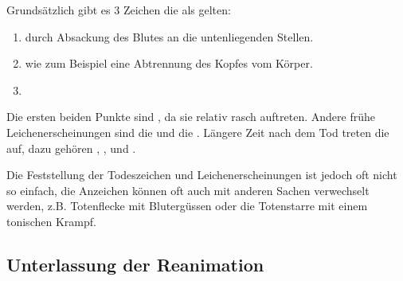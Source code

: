 {
Grundsätzlich gibt es 3 Zeichen die als  gelten\cite{ForMed2}:

\begin{enumerate}
    \item {} durch
    Absackung des Blutes an die untenliegenden Stellen.
    \item {}
    wie zum Beispiel eine Abtrennung des Kopfes vom Körper.
    \item {}
\end{enumerate}

Die ersten beiden Punkte sind , da sie relativ
rasch auftreten. Andere frühe Leichenerscheinungen sind die  und die . Längere Zeit nach dem Tod treten die  auf, dazu gehören ,
,  und .

Die Feststellung der Todeszeichen und Leichenerscheinungen
ist jedoch oft nicht so einfach, die Anzeichen können oft
auch mit anderen Sachen verwechselt werden, z.B.
Totenflecke mit Blutergüssen oder die Totenstarre mit einem
tonischen Krampf.
}{}{}{}{}






\subsection{Unterlassung der Reanimation}
\label{topic:reanimation-unterlassung}


              

